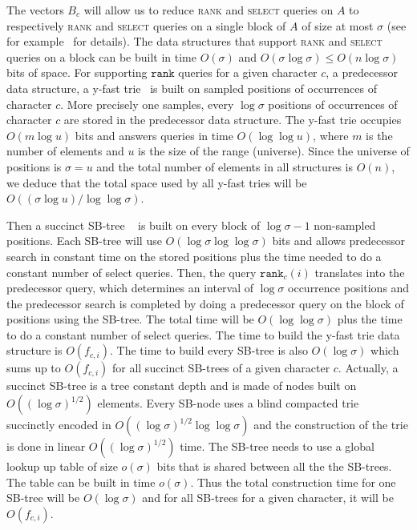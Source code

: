 \documentclass[a4paper]{article}
\begin{document}
The vectors $B_c$ will allow us to reduce \textsc{rank} and \textsc{select} queries on $A$ to respectively \textsc{rank} and \textsc{select} queries on a single block of $A$ of size at most $\sigma$ (see for example~\cite{GMR06} for details). 
The data structures that support \textsc{rank} and \textsc{select} queries on a block can be built in time $O(\sigma)$
and $O(\sigma\log\sigma)\leq O(n\log\sigma)$ bits of space. For supporting $\mathtt{rank}$ queries for a given character $c$, 
a predecessor data structure, a y-fast trie~\cite{willard1983log} is built on sampled positions of occurrences of character $c$. More precisely one samples, every $\log\sigma$ positions of occurrences of character $c$ are stored in the predecessor data structure. The y-fast trie occupies $O(m\log u)$ bits and answers queries in time $O(\log\log u)$, where $m$ is the number 
of elements and $u$ is the size of the range (universe). Since the universe of positions is $\sigma=u$ and the total number of elements in all structures is $O(n)$, we deduce that the total space used by all y-fast tries will be $O((\sigma\log u)/\log\log\sigma)$. 

Then a succinct SB-tree ~\cite{grossi2009more} is built on every block of $\log\sigma-1$ non-sampled positions. Each SB-tree will use $O(\log\sigma\log\log\sigma)$ bits and allows predecessor search in constant time on the stored positions plus the time needed to do a constant number of select queries.  
Then, the query $\mathtt{rank}_c(i)$ translates into the predecessor query, which determines an interval of $\log\sigma$ occurrence positions and the predecessor search is completed by doing a predecessor query on the block of positions using the 
SB-tree. The total time will be $O(\log\log\sigma)$ plus the time to do a constant number of select queries. 
The time to build the y-fast trie data structure is $O(f_{c,i})$. The time to build every SB-tree is also $O(\log\sigma)$ which sums up to $O(f_{c,i})$ for all succinct SB-trees of a given character $c$. Actually, a succinct SB-tree is a tree constant depth and is made of nodes built on $O((\log\sigma)^{1/2})$ elements. Every SB-node uses a blind compacted trie succinctly encoded in $O((\log\sigma)^{1/2}\log\log\sigma)$ and the construction of the trie is done in linear $O((\log\sigma)^{1/2})$ time. The SB-tree needs to use a global lookup up table of size $o(\sigma)$ bits that is shared between all the the SB-trees. 
The table can be built in time $o(\sigma)$. 
Thus the total construction time for one SB-tree will be $O(\log\sigma)$ and for all SB-trees for a given character, it will be $O(f_{c,i})$. 
\end{document}
